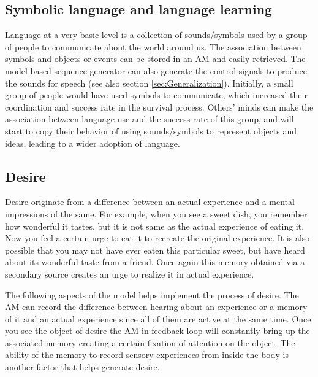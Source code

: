 \documentclass[reprint,amsmath,amssymb,apr,aip,onecolumn, 11pt]{revtex4-1}
\begin{document}
\subsection{Symbolic language and language learning}

Language at a very basic level is a collection of sounds/symbols used by a group of people to communicate about the world around us. The association between symbols and objects or events can be stored in an AM and easily retrieved. The model-based sequence generator can also generate the control signals to produce the sounds for speech (see also section \ref{sec:Generalization}). Initially, a small group of people would have used symbols to communicate, which increased their coordination and success rate in the survival process. Others' minds can make the association between language use and the success rate of this group, and will start to copy their behavior of using sounds/symbols to represent objects and ideas, leading to a wider adoption of language. 

\subsection{Desire}
Desire originate from a difference between an  actual experience and a mental impressions of the same. For example, when you see a sweet dish, you remember how wonderful it tastes, but it is not same as the actual experience of eating it. Now you feel a certain urge to eat it to recreate the original experience. It is also possible that you may not have ever eaten this particular sweet, but have heard about its wonderful taste from a friend. Once again this memory obtained via a secondary source creates an urge to realize it in actual experience. 

The following aspects of the model helps implement the process of desire.  The AM can record the difference between hearing about an experience or a memory of it and an actual experience since all of them are active at the same time. Once you see the object of desire the AM in feedback loop will constantly bring up the associated memory creating a certain fixation of attention on the object. The ability of the memory to record sensory experiences from inside the body is another factor that helps generate desire. 
\end{document}
